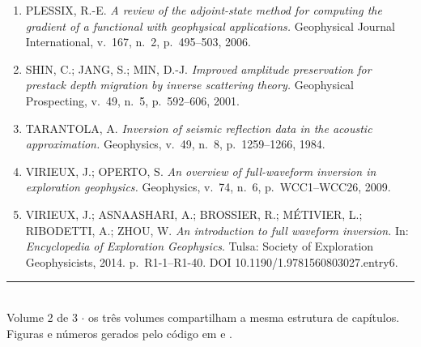 \documentclass[11pt,a4paper,oneside]{report}
\begin{document}
\begin{enumerate}[leftmargin=*, itemsep=3pt]
\item PLESSIX, R.-E. \emph{A review of the adjoint-state method for computing
the gradient of a functional with geophysical applications.} Geophysical
Journal International, v.~167, n.~2, p.~495--503, 2006.

\item SHIN, C.; JANG, S.; MIN, D.-J. \emph{Improved amplitude preservation for
prestack depth migration by inverse scattering theory.} Geophysical
Prospecting, v.~49, n.~5, p.~592--606, 2001.

\item TARANTOLA, A. \emph{Inversion of seismic reflection data in the acoustic
approximation.} Geophysics, v.~49, n.~8, p.~1259--1266, 1984.

\item VIRIEUX, J.; OPERTO, S. \emph{An overview of full-waveform inversion in
exploration geophysics.} Geophysics, v.~74, n.~6, p.~WCC1--WCC26, 2009.

\item VIRIEUX, J.; ASNAASHARI, A.; BROSSIER, R.; M\'ETIVIER, L.; RIBODETTI,
A.; ZHOU, W. \emph{An introduction to full waveform inversion.} In:
\emph{Encyclopedia of Exploration Geophysics}. Tulsa: Society of Exploration
Geophysicists, 2014. p.~R1-1--R1-40. DOI 10.1190/1.9781560803027.entry6.
\end{enumerate}

\vfill
\begin{center}
{\color{cianofwi}\rule{0.55\textwidth}{1pt}}\\[0.35cm]
{\small Volume 2 de 3 $\cdot$ os tr\^es volumes compartilham a mesma estrutura
de cap\'itulos.\\
Figuras e n\'umeros gerados pelo c\'odigo em  e .}
\end{center}
\end{document}

